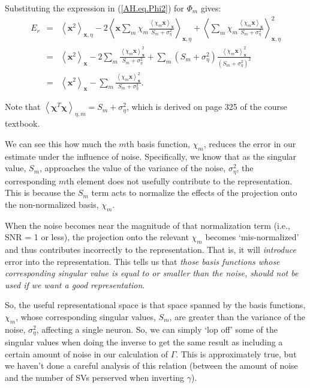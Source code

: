 \documentclass[10pt,letterpaper,oneside]{article}
\begin{document}
Substituting the expression in (\ref{AH.eq.Phi2}) for $\Phi_{m}$
gives:
\begin{eqnarray*}
E_{r} & = & \left\langle \mathbf{x}^{2}\right\rangle _{\mathbf{x},\eta}-2\left\langle \mathbf{x}\sum_{m}\chi_{m}\frac{\left\langle \chi_{m}\mathbf{x}\right\rangle _{\mathbf{x}}}{S_{m}+\sigma_{\eta}^{2}}\right\rangle _{\mathbf{x},\eta}+\left\langle \sum_{m}\chi_{m}\frac{\left\langle \chi_{m}\mathbf{x}\right\rangle _{\mathbf{x}}}{S_{m}+\sigma_{\eta}^{2}}\right\rangle _{\mathbf{x},\eta}^{2}\\
 & = & \left\langle \mathbf{x}^{2}\right\rangle _{\mathbf{x}}-2\sum_{m}\frac{\left\langle \chi_{m}\mathbf{x}\right\rangle _{\mathbf{x}}^{2}}{S_{m}+\sigma_{\eta}^{2}}+\sum_{m}(S_{m}+\sigma_{\eta}^{2})\frac{\left\langle \chi_{m}\mathbf{x}\right\rangle _{\mathbf{x}}^{2}}{\left(S_{m}+\sigma_{\eta}^{2}\right)^{2}}\\
 & = & \left\langle \mathbf{x}^{2}\right\rangle _{\mathbf{x}}-\sum_{m}\frac{\left\langle \chi_{m}\mathbf{x}\right\rangle _{\mathbf{x}}^{2}}{S_{m}+\sigma_{\eta}^{2}}.
\end{eqnarray*}

Note that $ \left\langle \mathbf{\chi}^T \mathbf{\chi}\right\rangle _{\eta,m} = S_{m}+\sigma_{\eta}^{2}$, which is derived on page 325 of the course textbook.

We can see this how much the $m$th basis function, $\chi_{m}$, reduces
the error in our estimate under the influence of noise. Specifically, we know that as the singular value, $S_{m}$, approaches
the value of the variance of the noise, $\sigma_{\eta}^{2}$, the
corresponding $m$th element does not usefully contribute to the representation.
This is because the $S_{m}$ term acts to normalize the effects of
the projection onto the non-normalized basis, $\chi_{m}$. 

When the noise becomes near the magnitude of that normalization term
(i.e., SNR = 1 or less), the projection onto the relevant $\chi_{m}$
becomes `mis-normalized' and thus contributes incorrectly to the representation.
That is, it will \emph{introduce} error into the representation. 
This tells us that \emph{those basis functions whose corresponding
singular value is equal to or smaller than the noise, should not be
used if we want a good representation}.

So, the useful representational space is that space spanned by the
basis functions, $\chi_{m}$, whose corresponding singular values,
$S_{m}$, are greater than the variance of the noise, $\sigma_{\eta}^{2}$,
affecting a single neuron.
So, we can simply `lop off' some of the singular values when doing
the inverse to get the same result as including a certain amount of
noise in our calculation of $\Gamma$. This is approximately true,
but we haven't done a careful analysis of this relation (between the
amount of noise and the number of SVs perserved when inverting $\gamma$).
\end{document}
